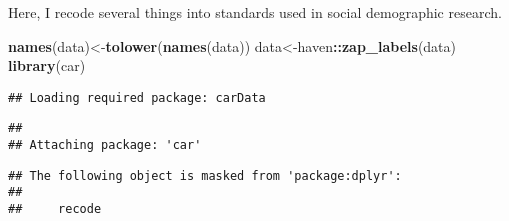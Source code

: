 \documentclass[]{article}
\newenvironment{Shaded}{\begin{snugshade}}{\end{snugshade}}
\newcommand{\KeywordTok}[1]{\textcolor[rgb]{0.13,0.29,0.53}{\textbf{#1}}}
\newcommand{\OperatorTok}[1]{\textcolor[rgb]{0.81,0.36,0.00}{\textbf{#1}}}
\newcommand{\NormalTok}[1]{#1}
\begin{document}
Here, I recode several things into standards used in social demographic
research.

\begin{Shaded}
\begin{Highlighting}[]
\KeywordTok{names}\NormalTok{(data)<-}\KeywordTok{tolower}\NormalTok{(}\KeywordTok{names}\NormalTok{(data))}
\NormalTok{data<-haven}\OperatorTok{::}\KeywordTok{zap_labels}\NormalTok{(data)}
\KeywordTok{library}\NormalTok{(car)}
\end{Highlighting}
\end{Shaded}

\begin{verbatim}
## Loading required package: carData
\end{verbatim}

\begin{verbatim}
## 
## Attaching package: 'car'
\end{verbatim}

\begin{verbatim}
## The following object is masked from 'package:dplyr':
## 
##     recode
\end{verbatim}
\end{document}
